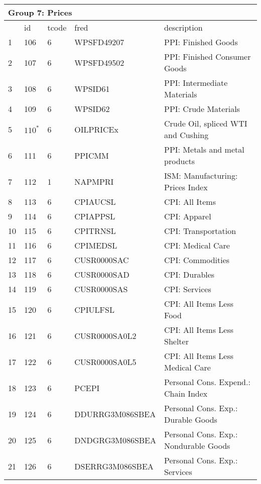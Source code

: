 \begin{table}[ht] 
\centering 
\begin{tabular}{lllll}
\multicolumn{5}{l}{Group 7: Prices} \\
\toprule
 & id & tcode & fred & description \\
\midrule
1 & 106 & 6 & WPSFD49207 & PPI: Finished Goods \\
2 & 107 & 6 & WPSFD49502 & PPI: Finished Consumer Goods \\
3 & 108 & 6 & WPSID61 & PPI: Intermediate Materials \\
4 & 109 & 6 & WPSID62 & PPI: Crude Materials \\
5 & $110^*$ & 6 & OILPRICEx & Crude Oil, spliced WTI and Cushing \\
6 & 111 & 6 & PPICMM & PPI: Metals and metal products \\
\rowcolor{gray} 7 & 112 & 1 & NAPMPRI & ISM: Manufacturing: Prices Index \\
8 & 113 & 6 & CPIAUCSL & CPI: All Items \\
9 & 114 & 6 & CPIAPPSL & CPI: Apparel \\
10 & 115 & 6 & CPITRNSL & CPI: Transportation \\
11 & 116 & 6 & CPIMEDSL & CPI: Medical Care \\
12 & 117 & 6 & CUSR0000SAC & CPI: Commodities \\
13 & 118 & 6 & CUSR0000SAD & CPI: Durables \\
14 & 119 & 6 & CUSR0000SAS & CPI: Services \\
15 & 120 & 6 & CPIULFSL & CPI: All Items Less Food \\
16 & 121 & 6 & CUSR0000SA0L2 & CPI: All Items Less Shelter \\
17 & 122 & 6 & CUSR0000SA0L5 & CPI: All Items Less Medical Care \\
18 & 123 & 6 & PCEPI & Personal Cons. Expend.: Chain Index \\
19 & 124 & 6 & DDURRG3M086SBEA & Personal Cons. Exp.: Durable Goods \\
20 & 125 & 6 & DNDGRG3M086SBEA & Personal Cons. Exp.: Nondurable Goods \\
21 & 126 & 6 & DSERRG3M086SBEA & Personal Cons. Exp.: Services \\
\bottomrule
\end{tabular}  
\end{table} 